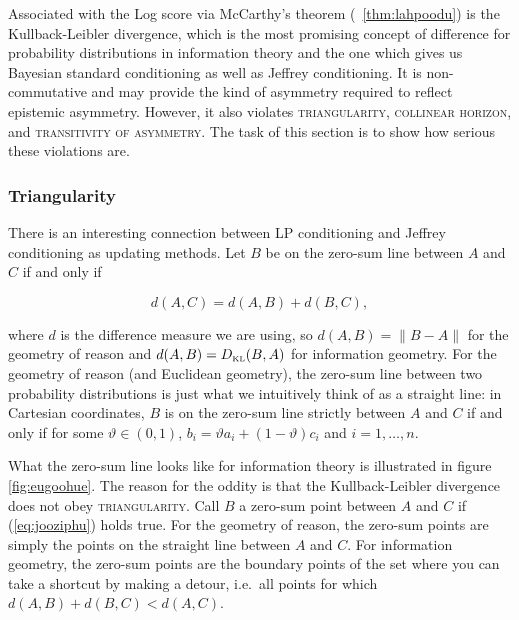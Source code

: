 \documentclass[12pt]{article}
\begin{document}
Associated with the Log score via McCarthy's theorem
({\heorem}~\ref{thm:lahpoodu}) is the Kullback-Leibler divergence,
which is the most promising concept of difference for probability
distributions in information theory and the one which gives us
Bayesian standard conditioning as well as Jeffrey conditioning. It is
non-commutative and may provide the kind of asymmetry required to
reflect epistemic asymmetry. However, it also violates
\textsc{triangularity}, \textsc{collinear horizon}, and
\textsc{transitivity of asymmetry}. The task of this section is to
show how serious these violations are.

\subsubsection{Triangularity}
\label{subsubsec:triangularity}

There is an interesting connection between LP conditioning and Jeffrey
conditioning as updating methods. Let $B$ be on the zero-sum line
between $A$ and $C$ if and only if

\begin{equation}
\label{eq:jooziphu}
d(A,C)=d(A,B)+d(B,C),
\end{equation}

where $d$ is the difference measure we are using, so $d(A,B)=\|B-A\|$
for the geometry of reason and $d(A,B)=D_{\mbox{\tiny KL}}(B,A)$ for
information geometry. For the geometry of reason (and Euclidean
geometry), the zero-sum line between two probability distributions is
just what we intuitively think of as a straight line: in Cartesian
coordinates, $B$ is on the zero-sum line strictly between $A$ and $C$
if and only if for some $\vartheta\in(0,1)$,
$b_{i}=\vartheta{}a_{i}+(1-\vartheta)c_{i}$ and $i=1,\ldots,n$.

What the zero-sum line looks like for information theory is
illustrated in figure \ref{fig:eugoohue}. The reason for the oddity is
that the Kullback-Leibler divergence does not obey
\textsc{triangularity}. Call $B$ a zero-sum point between $A$ and $C$
if (\ref{eq:jooziphu}) holds true. For the geometry of reason, the
zero-sum points are simply the points on the straight line between $A$
and $C$. For information geometry, the zero-sum points are the
boundary points of the set where you can take a shortcut by making a
detour, i.e.\ all points for which $d(A,B)+d(B,C)<d(A,C)$.
\end{document}

